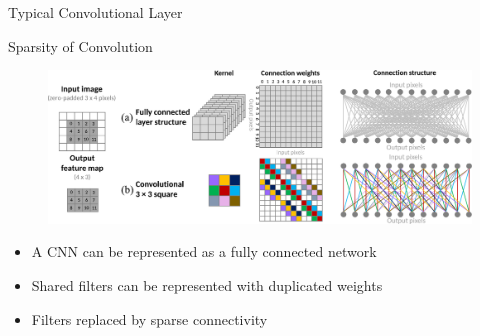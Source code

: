 \documentclass[t,xcolor=dvipsnames]{beamer}
\begin{document}
\begin{frame}{Typical Convolutional Layer}
\begin{figure}
{
    }
\end{figure}
\end{frame}

\begin{frame}{Sparsity of Convolution}
\begin{figure}
    \includegraphics[width=\textwidth]{../Figs/PDF/sparseconn4}
\end{figure}
\begin{itemize}
    \item A CNN can be represented as a fully connected network
    \item Shared filters can be represented with duplicated weights
    \item Filters replaced by sparse connectivity
\end{itemize}
\end{frame}

\end{document}
